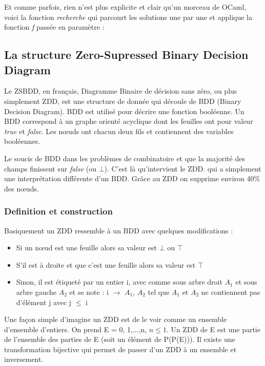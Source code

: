 \documentclass[a4paper]{article}
\begin{document}
Et comme parfois, rien n'est plus explicite et clair qu'un morceau de OCaml, 
voici la fonction \emph{recherche} qui parcourt les solutions une par une et 
applique la fonction \emph{f} passée en paramètre :





\subsection{La structure Zero-Supressed Binary Decision Diagram}



Le ZSBDD, en français, Diagramme Binaire de décision sans zéro, ou 
plus simplement ZDD, est une structure de donnée qui découle de BDD (Binary 
Decision Diagram). BDD est utilisé pour décrire une fonction booléenne. Un
BDD correspond à un graphe orienté acyclique dont les feuilles ont pour valeur
\emph{true} et \emph{false}. Les n\oe uds ont chacun deux fils et contiennent 
des variables booléennes.

Le soucis de BDD dans les problèmes de combinatoire et que la majorité des 
champs finissent sur \emph{false} (ou $\bot$). C'est là qu'intervient le ZDD. 
qui a simplement une interprétation différente d'un BDD. Grâce au ZDD on 
supprime environ 40\% des n\oe uds.

\subsubsection{Definition et construction}



Basiquement un ZDD ressemble à un BDD avec quelques modifications : 

\begin{itemize}
\item Si un n\oe ud est une feuille alors sa valeur est $\bot$ ou $\top$
\item S'il est à droite et que c'est une feuille alors sa valeur est $\top$
\item Sinon, il est étiqueté par un entier i, avec comme sous arbre droit 
$A_1$ et sous arbre gauche $A_2$ et se note : i $\rightarrow$ $A_1$, $A_2$ tel
que $A_1$ et $A_2$ ne contiennent pas d'élément j avec j $\leq$ i \\
\end{itemize} 

Une façon simple d'imagine un ZDD est de le voir comme un ensemble d'ensemble 
d'entiers. 
On prend E = {0, 1,...,n}, $n \leq 1$. Un ZDD de E est une partie de l'ensemble 
des parties de E (soit un élément de P(P(E))). Il existe une transformation 
bijective qui permet de passer d'un ZDD à un ensemble et inversement.
\end{document}

